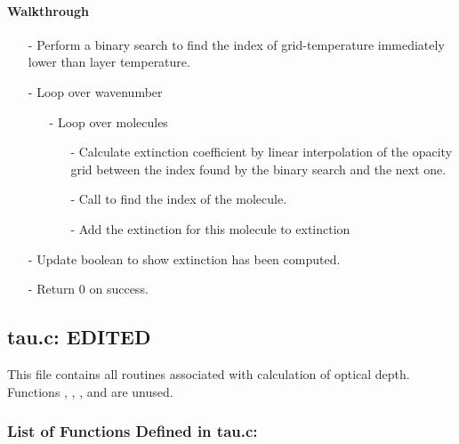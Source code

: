 \documentclass[letterpaper,12pt]{article}
\begin{document}
\paragraph{Walkthrough}
\begin{enumerate}[leftmargin=10pt, noitemsep, parsep=0pt, topsep=0ex]
\item[-] Perform a binary search to find the index of grid-temperature immediately lower than layer temperature.
\item[-] Loop over wavenumber
\begin{enumerate}[leftmargin=10pt, noitemsep, parsep=0pt, topsep=0ex]
\item[-] Loop over molecules
\begin{enumerate}[leftmargin=10pt, noitemsep, parsep=0pt, topsep=0ex]
\item[-] Calculate extinction coefficient by linear interpolation of the opacity grid between the index found by the binary search and the next one.
\item[-] Call  to find the index of the molecule.
\item[-] Add the extinction for this molecule to extinction
\end{enumerate}
\end{enumerate}
\item[-] Update boolean to show extinction has been computed.
\item[-] Return 0 on success.
\end{enumerate}

\newpage
\subsection{tau.c: EDITED}
This file contains all routines associated with calculation of optical depth. Functions , , , and  are unused.
\subsubsection{List of Functions Defined in tau.c:}

 \newline

 \newline
\end{document}

